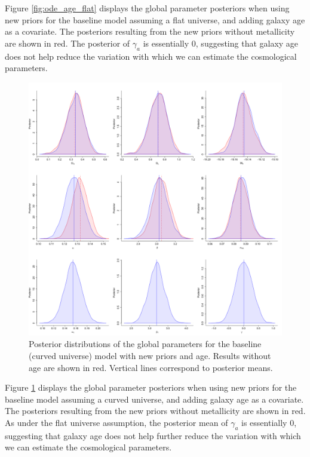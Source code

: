 Figure \ref{fig:ode_age_flat} displays the global parameter posteriors when using new priors for the baseline model assuming a flat universe, and adding galaxy age as a covariate. The posteriors resulting from the new priors without metallicity are shown in red. The posterior of $\gamma_{a}$ is essentially 0, suggesting that galaxy age does not help reduce the variation with which we can estimate the cosmological parameters.

\begin{figure}
\centering
	\includegraphics[width=\textwidth]{figures/ode/split_age_curv_camp.png}
\caption{Posterior distributions of the global parameters for the baseline (curved universe) model with new priors and age. Results without age are shown in red. Vertical lines correspond to posterior means.}
\label{fig:ode_age_curv}
\end{figure}

Figure \ref{fig:ode_age_curv} displays the global parameter posteriors when using new priors for the baseline model assuming a curved universe, and adding galaxy age as a covariate. The posteriors resulting from the new priors without metallicity are shown in red. As under the flat universe assumption, the posterior mean of $\gamma_{a}$ is essentially 0, suggesting that galaxy age does not help further reduce the variation with which we can estimate the cosmological parameters.

